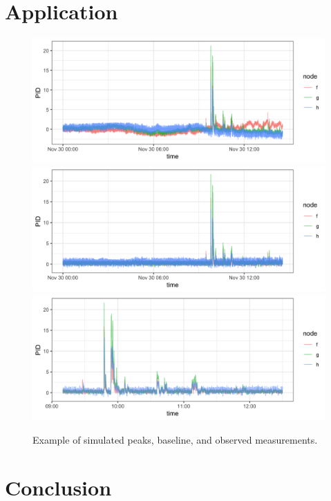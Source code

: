 \documentclass[12pt]{article}
\begin{document}
	
	
	\section{Application}
	
	
	\begin{figure}
		\caption{Example of simulated peaks, baseline, and observed measurements.}
		\includegraphics[width = \linewidth]{Figures/uncorrected_data.png}
		\includegraphics[width = \linewidth]{Figures/corrected_data.png}
		\includegraphics[width = \linewidth]{Figures/corrected_zoom_data.png}
	\end{figure}
	

	
	
	\section{Conclusion}
	\label{sec:conc}
	
\end{document}
